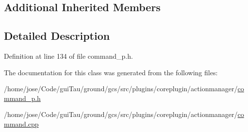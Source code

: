 \subsection*{Additional Inherited Members}


\subsection{Detailed Description}


Definition at line 134 of file command\-\_\-p.\-h.



The documentation for this class was generated from the following files\-:\begin{DoxyCompactItemize}
\item 
/home/jose/\-Code/gui\-Tau/ground/gcs/src/plugins/coreplugin/actionmanager/\hyperlink{command__p_8h}{command\-\_\-p.\-h}\item 
/home/jose/\-Code/gui\-Tau/ground/gcs/src/plugins/coreplugin/actionmanager/\hyperlink{command_8cpp}{command.\-cpp}\end{DoxyCompactItemize}

